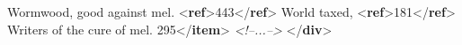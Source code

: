 \begin{shaded}
\hspace*{1em}Wormwood, good against mel. {<\textbf{ref}>}443{</\textbf{ref}>}\mbox{}\newline 
\hspace*{1em}\mbox{}\newline 
\hspace*{1em}World taxed, {<\textbf{ref}>}181{</\textbf{ref}>}\mbox{}\newline 
\hspace*{1em}\mbox{}\newline 
\hspace*{1em}Writers of the cure of mel. 295{</\textbf{item}>}\mbox{}\newline 
\textit{<!--...-->}\mbox{}\newline 
{}\mbox{}\newline 
{</\textbf{div}>}\end{shaded}\egroup\par \par
